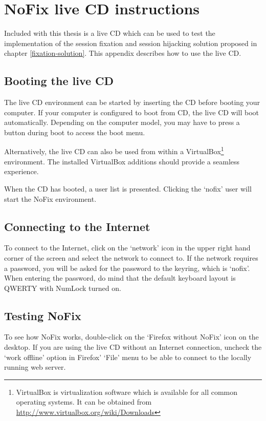 \chapter{NoFix live CD instructions}\label{manual}

Included with this thesis is a live CD which can be used to test the implementation of the session fixation and session hijacking solution proposed in chapter \ref{fixation-solution}. This appendix describes how to use the live CD.

\section{Booting the live CD}

The live CD environment can be started by inserting the CD before booting your computer. If your computer is configured to boot from CD, the live CD will boot automatically. Depending on the computer model, you may have to press a button during boot to access the boot menu.

Alternatively, the live CD can also be used from within a VirtualBox\footnote{VirtualBox is virtualization software which is available for all common operating systems. It can be obtained from \url{http://www.virtualbox.org/wiki/Downloads}} environment. The installed VirtualBox additions should provide a seamless experience.

When the CD has booted, a user list is presented. Clicking the `nofix' user will start the NoFix environment.

\section{Connecting to the Internet}

To connect to the Internet, click on the `network' icon in the upper right hand corner of the screen and select the network to connect to. If the network requires a password, you will be asked for the password to the keyring, which is `nofix'. When entering the password, do mind that the default keyboard layout is QWERTY with NumLock turned on.

\section{Testing NoFix}

To see how NoFix works, double-click on the `Firefox without NoFix' icon on the desktop. If you are using the live CD without an Internet connection, uncheck the `work offline' option in Firefox' `File' menu to be able to connect to the locally running web server.

